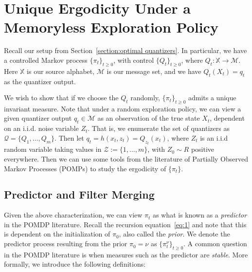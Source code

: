 \documentclass[conference, draftcls, onecolumn]{IEEEtran}
\begin{document}
\section{Unique Ergodicity Under a Memoryless Exploration Policy}\label{section:unique-ergodicity}
Recall our setup from Section~\ref{section:optimal quantizers}. In particular, we have a controlled Markov process \(\{\pi_t\}_{t\ge0}\), with control \(\{Q_t\}_{t\ge0}\), where \(Q_t : \mathbb{X} \to \mathcal{M}\). Here \(\mathbb{X}\) is our source alphabet, \(\mathcal{M}\) is our message set, and we have \(Q_t(X_t) = q_t\) as the quantizer output.

We wish to show that if we choose the \(Q_t\) randomly, \( \{\pi_t\}_{t\ge0} \) admits a unique invariant measure. Note that under a random exploration policy, we can view a given quantizer output \(q_t \in \mathcal{M}\) as an observation of the true state \( X_t \), dependent on an i.i.d. noise variable \( Z_t\). That is, we enumerate the set of quantizers as \(\mathcal{Q} = \{Q_1,\ldots,Q_m\} \). Then let \( q_t = h(x_t,z_t) = Q_{z_t}(x_t) \), where \( Z_t \) is an i.i.d random variable taking values in \( \mathcal{Z} := \{1,\ldots,m\} \), with \(Z_0 \sim R\) positive everywhere. Then we can use some tools from the literature of Partially Observed Markov Processes (POMPs) to study the ergodicity of \( \{\pi_t\} \).

\subsection{Predictor and Filter Merging}




Given the above characterization, we can view \( \pi_t \) as what is known as a \emph{predictor} in the POMDP literature. Recall the recursion equation~\eqref{eq:1} and note that this is dependent on the initialization of \( \pi_0 \), also called the \emph{prior}. We denote the predictor process resulting from the prior \( \pi_0 = \nu \) as \( \{\pi_t^\nu \}_{t\ge0} \). A common question in the POMDP literature is when measures such as the predictor are \emph{stable}. More formally, we introduce the following definitions:
\end{document}
